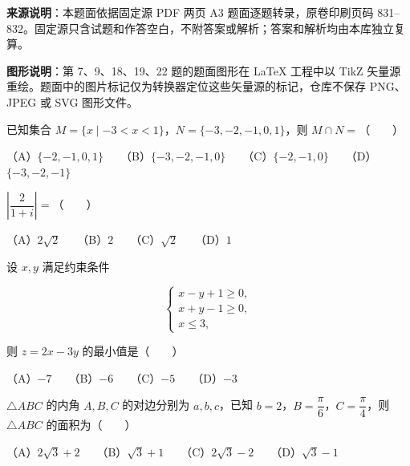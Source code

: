 


\begin{gktip}
\textbf{来源说明}：本题面依据固定源 PDF 两页 A3 题面逐题转录，原卷印刷页码 831–832。固定源只含试题和作答空白，不附答案或解析；答案和解析均由本库独立复算。

\textbf{图形说明}：第 7、9、18、19、22 题的题面图形在 LaTeX 工程中以 TikZ 矢量源重绘。题面中的图片标记仅为转换器定位这些矢量源的标记，仓库不保存 PNG、JPEG 或 SVG 图形文件。
\end{gktip}


\begin{question}
已知集合 $M=\{x\mid-3<x<1\}$，$N=\{-3,-2,-1,0,1\}$，则 $M\cap N=$\mbox{（　　）}

（A）$\{-2,-1,0,1\}$　　（B）$\{-3,-2,-1,0\}$　　（C）$\{-2,-1,0\}$　　（D）$\{-3,-2,-1\}$

\end{question}
\begin{question}
$\left|\dfrac{2}{1+i}\right|=$\mbox{（　　）}

（A）$2\sqrt2$　　（B）$2$　　（C）$\sqrt2$　　（D）$1$

\end{question}
\begin{question}
设 $x,y$ 满足约束条件

\nopagebreak[4]
\[
\begin{cases}
x-y+1\geqslant0,\\
x+y-1\geqslant0,\\
x\leqslant3,
\end{cases}
\]

则 $z=2x-3y$ 的最小值是\mbox{（　　）}

（A）$-7$　　（B）$-6$　　（C）$-5$　　（D）$-3$

\end{question}
\begin{question}
$\triangle ABC$ 的内角 $A,B,C$ 的对边分别为 $a,b,c$，已知 $b=2$，$B=\dfrac\pi6$，$C=\dfrac\pi4$，则 $\triangle ABC$ 的面积为\mbox{（　　）}

（A）$2\sqrt3+2$　　（B）$\sqrt3+1$　　（C）$2\sqrt3-2$　　（D）$\sqrt3-1$

\end{question}
